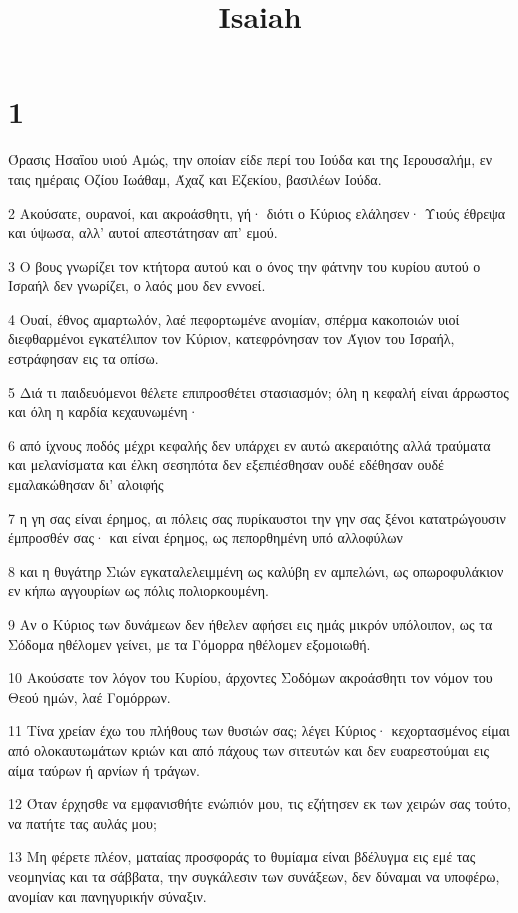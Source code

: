 

\title{Isaiah}


\chapter{1}

\par Όρασις Ησαΐου υιού Αμώς, την οποίαν είδε περί του Ιούδα και της Ιερουσαλήμ, εν ταις ημέραις Οζίου Ιωάθαμ, Άχαζ και Εζεκίου, βασιλέων Ιούδα.
\par 2 Ακούσατε, ουρανοί, και ακροάσθητι, γή· διότι ο Κύριος ελάλησεν· Υιούς έθρεψα και ύψωσα, αλλ' αυτοί απεστάτησαν απ' εμού.
\par 3 Ο βους γνωρίζει τον κτήτορα αυτού και ο όνος την φάτνην του κυρίου αυτού ο Ισραήλ δεν γνωρίζει, ο λαός μου δεν εννοεί.
\par 4 Ουαί, έθνος αμαρτωλόν, λαέ πεφορτωμένε ανομίαν, σπέρμα κακοποιών υιοί διεφθαρμένοι εγκατέλιπον τον Κύριον, κατεφρόνησαν τον Άγιον του Ισραήλ, εστράφησαν εις τα οπίσω.
\par 5 Διά τι παιδευόμενοι θέλετε επιπροσθέτει στασιασμόν; όλη η κεφαλή είναι άρρωστος και όλη η καρδία κεχαυνωμένη·
\par 6 από ίχνους ποδός μέχρι κεφαλής δεν υπάρχει εν αυτώ ακεραιότης αλλά τραύματα και μελανίσματα και έλκη σεσηπότα δεν εξεπιέσθησαν ουδέ εδέθησαν ουδέ εμαλακώθησαν δι' αλοιφής
\par 7 η γη σας είναι έρημος, αι πόλεις σας πυρίκαυστοι την γην σας ξένοι κατατρώγουσιν έμπροσθέν σας· και είναι έρημος, ως πεπορθημένη υπό αλλοφύλων
\par 8 και η θυγάτηρ Σιών εγκαταλελειμμένη ως καλύβη εν αμπελώνι, ως οπωροφυλάκιον εν κήπω αγγουρίων ως πόλις πολιορκουμένη.
\par 9 Αν ο Κύριος των δυνάμεων δεν ήθελεν αφήσει εις ημάς μικρόν υπόλοιπον, ως τα Σόδομα ηθέλομεν γείνει, με τα Γόμορρα ηθέλομεν εξομοιωθή.
\par 10 Ακούσατε τον λόγον του Κυρίου, άρχοντες Σοδόμων ακροάσθητι τον νόμον του Θεού ημών, λαέ Γομόρρων.
\par 11 Τίνα χρείαν έχω του πλήθους των θυσιών σας; λέγει Κύριος· κεχορτασμένος είμαι από ολοκαυτωμάτων κριών και από πάχους των σιτευτών και δεν ευαρεστούμαι εις αίμα ταύρων ή αρνίων ή τράγων.
\par 12 Όταν έρχησθε να εμφανισθήτε ενώπιόν μου, τις εζήτησεν εκ των χειρών σας τούτο, να πατήτε τας αυλάς μου;
\par 13 Μη φέρετε πλέον, ματαίας προσφοράς το θυμίαμα είναι βδέλυγμα εις εμέ τας νεομηνίας και τα σάββατα, την συγκάλεσιν των συνάξεων, δεν δύναμαι να υποφέρω, ανομίαν και πανηγυρικήν σύναξιν.
